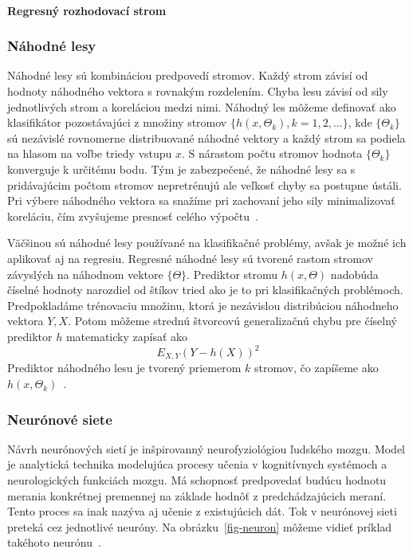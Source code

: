 \documentclass[a4paper,slovak,12pt,appendix]{article}
\begin{document}
\paragraph{Regresný rozhodovací strom}


\subsubsection{Náhodné lesy}
Náhodné lesy sú kombináciou predpovedí stromov. Každý strom závisí od hodnoty
náhodného vektora s rovnakým rozdelením. Chyba lesu závisí od sily jednotlivých
strom a koreláciou medzi nimi. Náhodný les môžeme definovať ako klasifikátor
pozostávajúci z množiny stromov $\{h(x, \Theta_k), k=1, 2, ... \}$, kde
$\{\Theta_k\}$ sú nezávislé rovnomerne distribuované náhodné vektory a každý
strom sa podiela na hlasom na voľbe triedy vstupu $x$. S nárastom počtu stromov
hodnota $\{\Theta_k\}$ konverguje k určitému bodu. Tým je zabezpečené, že
náhodné lesy sa s pridávajúcim počtom stromov nepretrénujú ale veľkosť chyby sa
postupne ústáli. Pri výbere náhodného vektora sa snažíme pri zachovaní jeho
sily minimalizovať koreláciu, čím zvyšujeme presnosť celého
výpočtu~\cite{Breiman2001}.

Väčšinou sú náhodné lesy používané na klasifikačné problémy, avšak je možné ich
aplikovať aj na regresiu. Regresné náhodné lesy sú tvorené rastom stromov
závyslých na náhodnom vektore $\{\Theta\}$. Prediktor stromu $h(x, \Theta)$
nadobúda číselné hodnoty narozdiel od štíkov tried ako je to pri klasifikačných
problémoch. Predpokladáme trénovaciu množinu, ktorá je nezávislou distribúciou
náhodneho vektora $Y, X$. Potom môžeme strednú štvorcovú generalizačnú chybu
pre číselný prediktor $h$ matematicky zapísať ako
\begin{equation}
  E_{X, Y} (Y - h(X))^2
  \label{eq-random-error}
\end{equation}
Prediktor náhodného lesu je tvorený priemerom $k$ stromov, čo zapíšeme ako
$h(x, \Theta_k)$~\cite{Breiman2001}.


\subsubsection{Neurónové siete}
Návrh neurónových sietí je inšpirovanný neurofyziológiou ľudského mozgu. Model
je analytická technika modelujúca procesy učenia v kognitívnych systémoch
a neurologických funkciách mozgu. Má schopnosť predpovedať budúcu hodnotu
merania konkrétnej premennej na základe hodnôť z predchádzajúcich meraní. Tento
proces sa inak nazýva aj učenie z existujúcich dát. Tok v neurónovej sieti
preteká cez jednotlivé neuróny. Na obrázku~\ref{fig-neuron} môžeme vidieť
príklad takéhoto neurónu~\cite{Tso2007}.
\end{document}
